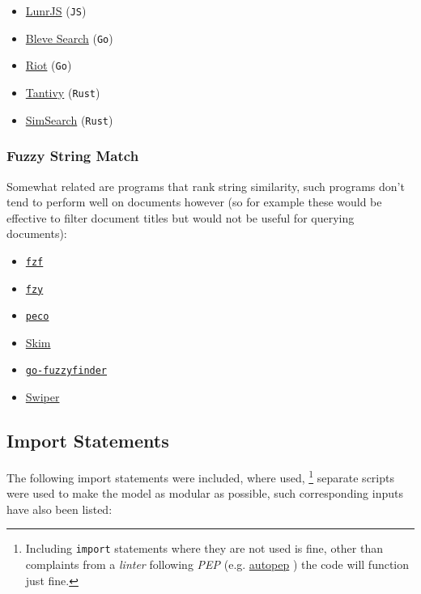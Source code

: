 \documentclass[a4paper,11pt,twoside]{article}
\begin{document}
\begin{itemize}
\item \href{https://github.com/olivernn/lunr.js/}{LunrJS}  (\texttt{JS}) \cite{nightingaleOlivernnLunrJs2021}
\item \href{https://github.com/blevesearch/bleve}{Bleve Search} (\texttt{Go}) \cite{martyschochBleveSearchDocumentation}
\item \href{https://github.com/go-ego/riot}{Riot} (\texttt{Go}) \cite{vzGoegoRiot2021}
\item \href{https://github.com/tantivy-search/tantivy}{Tantivy} (\texttt{Rust}) \cite{clementrenaultMeilisearchMeiliSearch2021}
\item \href{https://github.com/andylokandy/simsearch-rs}{SimSearch} (\texttt{Rust}) \cite{lokAndylokandySimsearchrs2021}
\end{itemize}


\subsubsection{Fuzzy String Match}
\label{sec:orgc4cd371}
Somewhat related are programs that rank string similarity, such programs don't tend
to perform well on documents however (so for example these would
be effective to filter document titles but would not be useful for
querying documents):

\begin{itemize}
\item \href{https://github.com/junegunn/fzf}{\texttt{fzf}} \cite{choiJunegunnFzf2021}
\item \href{https://github.com/jhawthorn/fzy}{\texttt{fzy}} \cite{hawthornJhawthornFzy2021}
\item \href{https://github.com/peco/peco}{\texttt{peco}} \cite{lestrratPecoPeco2021}
\item \href{https://github.com/lotabout/skim}{Skim} \cite{zhangLotaboutSkim2021}
\item \href{https://github.com/lotabout/skim}{\texttt{go-fuzzyfinder}} \cite{ktrKtr0731Gofuzzyfinder2021}
\item \href{https://github.com/lotabout/skim}{Swiper} \cite{krehelAboaboSwiper2021}
\end{itemize}

\subsection{Import Statements}
\label{sec:org4474af5}
The following import statements were included, where used, \footnote{Including \texttt{import} statements where they are not used is fine,
other than complaints from a \emph{linter} following \emph{PEP}
\cite{nickcoghlanPEPStyleGuide2001} (e.g. \href{https://pypi.org/project/autopep8/}{autopep}
\cite{hattoriAutopep8ToolThat}) the code will function just fine.}
separate scripts were used to make the model as modular as possible,
such corresponding inputs have also been listed:
\end{document}
